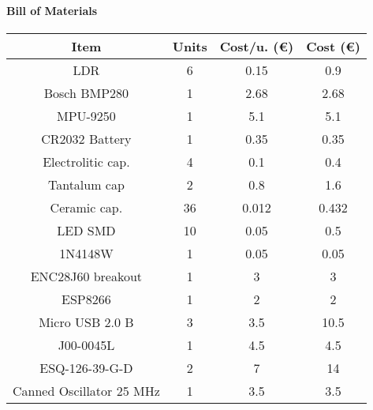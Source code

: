 \begin{appendices}
\paragraph{Bill of Materials}

\begin{table}[H]
\centering
\begin{tabular}{@{}cccc@{}}
\toprule
\textbf{Item}            & \textbf{Units}       & \textbf{Cost/u. (€)} & \textbf{Cost (€)}    \\ \midrule
LDR                      & 6                    & 0.15                 & 0.9                  \\
Bosch BMP280             & 1                    & 2.68                 & 2.68                 \\
MPU-9250                 & 1                    & 5.1                  & 5.1                  \\
CR2032 Battery           & 1                    & 0.35                 & 0.35                 \\
Electrolitic cap.        & 4                    & 0.1                  & 0.4                  \\
Tantalum cap             & 2                    & 0.8                  & 1.6                  \\
Ceramic cap.             & 36                   & 0.012                & 0.432                \\
LED SMD                  & 10                   & 0.05                 & 0.5                  \\
1N4148W                  & 1                    & 0.05                 & 0.05                 \\
ENC28J60 breakout        & 1                    & 3                    & 3                    \\
ESP8266                  & 1                    & 2                    & 2                    \\
Micro USB 2.0 B          & 3                    & 3.5                  & 10.5                 \\
J00-0045L                & 1                    & 4.5                  & 4.5                  \\
ESQ-126-39-G-D           & 2                    & 7                    & 14                   \\
Canned Oscillator 25 MHz & 1                    & 3.5                  & 3.5                  \\

\end{tabular}
\end{table}
\end{appendices}
